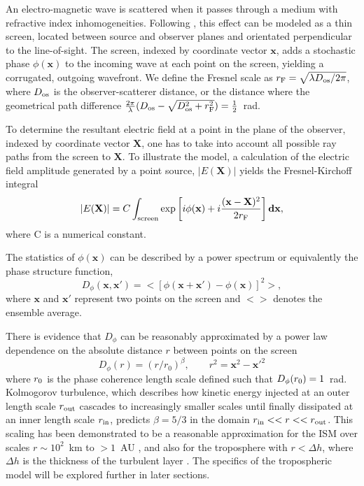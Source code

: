 An electro-magnetic wave is scattered when it passes through a medium with refractive index inhomogeneities. Following \citet{Narayan_1992}, this effect can be modeled as a thin screen, located between source and observer planes and orientated perpendicular to the line-of-sight. The screen, indexed by coordinate vector $\mathbf{x}$, adds a stochastic phase $\phi(\mathbf{x})$ to the incoming wave at each point on the screen, yielding a corrugated, outgoing wavefront. We define the Fresnel scale as  $r_{\rm F} = \sqrt{\lambda D_{\rm os}/2\pi}$, where $D_{\rm os}$ is the observer-scatterer distance, or the distance where the geometrical path difference $\frac{2\pi}{\lambda} (D_{\rm os} - \sqrt{D_{\rm os}^2 + r_{\rm F}^2}) =\frac{1}{2}$~rad.

To determine the resultant electric field at a point in the plane of the observer, indexed by coordinate vector $\mathbf{X}$, one has to take into account all possible ray paths from the screen to $\mathbf{X}$. To illustrate the model, a calculation of the electric field amplitude generated by a point source, $|E(\mathbf{X})|$ yields the Fresnel-Kirchoff integral \citep*{BORN_1980}
\begin{equation}\label{Fresnel- Kirchoff}
|E(\mathbf{X})| = C \int_{\rm screen} \exp\left[i\phi(\mathbf{x}) + i \frac{(\mathbf{x}-\mathbf{X})^2}{2 r_{\rm F}}\right]\mathbf{dx},
\end{equation}
where C is a numerical constant.

The statistics of $\phi(\mathbf{x})$ can be described by a power spectrum or equivalently the phase structure function,
\begin{equation}\label{eq:D_phi}
D_\phi (\mathbf{x},\mathbf{x'}) = < \left[ \phi(\mathbf{x} +\mathbf{x'}) - \phi(\mathbf{x})\right]^2 >,
\end{equation}
where $\mathbf{x}$ and $\mathbf{x'} $ represent two points on the screen and $<>$ denotes the ensemble average. 

There is evidence that $D_\phi$ can be reasonably approximated by a power law dependence on the absolute distance $r$ between points on the screen  \citep{Armstrong_1995,carilli_1997}
\begin{equation}
D_\phi (r) =  (r/r_0)^\beta,\qquad r^2 = \mathbf{x}^2 - \mathbf{x'}^2
\label{kolmogorov}
\end{equation}
where $r_{\rm 0}$ is the phase coherence length scale defined such that $D_\phi(r_{\rm 0}) = 1$~rad. 
Kolmogorov turbulence, which describes how kinetic energy injected at an outer length scale $r_{\rm out}$ cascades to increasingly smaller scales until finally dissipated at an inner length scale $r_{\rm in}$, predicts $\beta = 5/3$ in the domain ${r_{\rm in}<<r<<r_{\rm out}}$. This scaling has been demonstrated to be a reasonable approximation for the ISM over scales $r \sim 10^2$~km to $>1$~AU \citep*{Johnson_2015a}, and also for the troposphere with $r< \Delta h$, where $\Delta h$ is the thickness of the turbulent layer \cite{Coulman_1985}. The specifics of the tropospheric model will be explored further in later sections.

